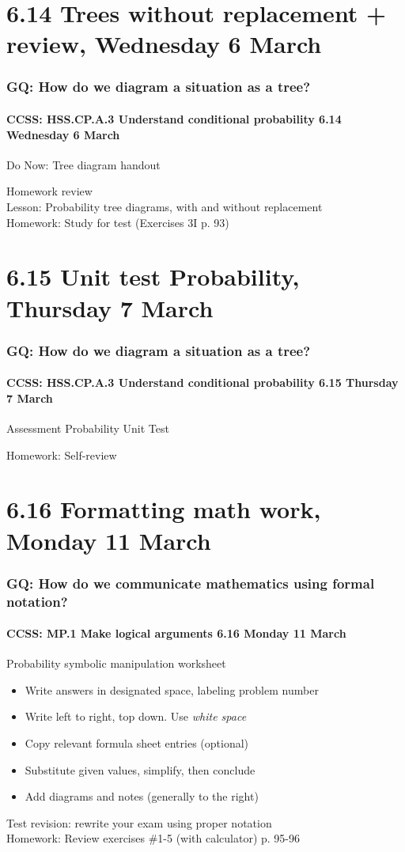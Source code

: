 \documentclass{beamer}
\begin{document}
\section{6.14 Trees without replacement + review, Wednesday 6 March}
  \frame
  {
    \frametitle{GQ: How do we diagram a situation as a tree?}
    \framesubtitle{CCSS: HSS.CP.A.3 Understand conditional probability \hfill \alert{6.14 Wednesday 6 March}}

    \begin{block}{Do Now: Tree diagram handout}
    \end{block}
    Homework review\\
    Lesson: Probability tree diagrams, with and without replacement\\[0.5cm]
    Homework: Study for test (Exercises 3I p. 93)
  }


\section{6.15 Unit test Probability, Thursday 7 March}
  \frame
  {
    \frametitle{GQ: How do we diagram a situation as a tree?}
    \framesubtitle{CCSS: HSS.CP.A.3 Understand conditional probability \hfill \alert{6.15 Thursday 7 March}}

    \begin{block}{Assessment Probability Unit Test}
    \end{block}

    Homework: Self-review
  }

\section{6.16 Formatting math work, Monday 11 March}
  \frame
  {
    \frametitle{GQ: How do we communicate mathematics using formal notation?}
    \framesubtitle{CCSS: MP.1 Make logical arguments \hfill \alert{6.16 Monday 11 March}}

    \begin{block}{Probability symbolic manipulation worksheet}
      \begin{itemize}
        \item Write answers in designated space, labeling problem number
        \item Write left to right, top down. Use \emph{white space}
        \item Copy relevant formula sheet entries (optional)
        \item Substitute given values, simplify, then conclude
        \item Add diagrams and notes (generally to the right)
    \end{itemize}
    \end{block}
    Test revision: rewrite your exam using proper notation\\
    Homework: Review exercises \#1-5 (with calculator) p. 95-96
  }
\end{document}
